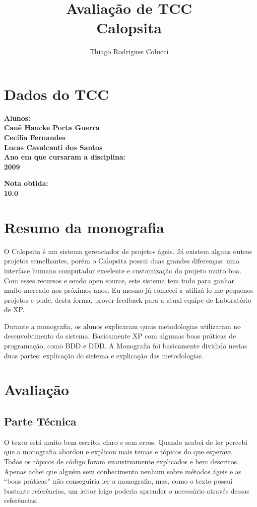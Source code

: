 \documentclass[12pt,a4paper]{article}
\title{Avaliação de TCC\\Calopsita}
\author{Thiago Rodrigues Colucci}
\begin{document}
\maketitle

\newpage

\tableofcontents
\newpage
\section{Dados do TCC}
\bf{Alunos:}\\
Cauê Haucke Porta Guerra\\
Cecilia Fernandes\\
Lucas Cavalcanti dos Santos\\


\bf{Ano em que cursaram a disciplina:}\\2009


\bf{Nota obtida:}\\10.0


\section{Resumo da monografia}

O Calopsita é um sistema gerenciador de projetos ágeis. Já existem alguns outros projetos semelhantes, porém o Calopsita possui duas grandes diferenças: uma interface humano computador excelente e customização do projeto muito boa. Com esses recursos e sendo open source, este sistema tem tudo para ganhar muito mercado nos próximos anos. Eu mesmo já comecei a utilizá-lo me pequenos projetos e pude, desta forma, prover feedback para a atual equipe de Laboratório de XP.

Durante a monografia, os alunos explicaram quais metodologias utilizaram no desenvolvimento do sistema. Basicamente XP com algumas boas práticas de programação, como BDD e DDD. A Monografia foi basicamente dividida nestas duas partes: explicação do sistema e explicação das metodologias.

\section{Avaliação}
\subsection{Parte Técnica}
O texto está muito bem escrito, claro e sem erros. Quando acabei de ler percebi que a monografia abordou e explicou mais temas e tópicos do que esperava. Todos os tópicos de código foram exaustivamente explicados e bem descritos. Apenas achei que alguém sem conhecimento nenhum sobre métodos ágeis e as ``boas práticas'' não conseguiria ler a monografia, mas, como o texto possui bastante referências, um leitor leigo poderia aprender o necessário através dessas referências.
\end{document}
